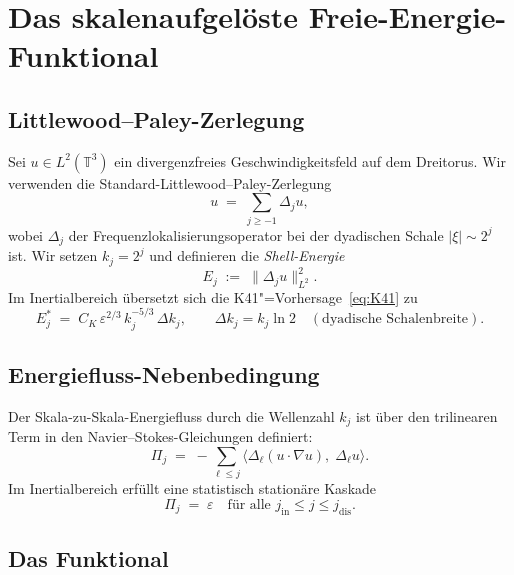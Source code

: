 \documentclass[12pt,a4paper]{article}
\theoremstyle{breakdef}
\theoremstyle{breakplain}
\theoremstyle{breakdef}
\begin{document}
\section{Das skalenaufgelöste Freie-Energie-Funktional}\label{sec:functional}

\subsection{Littlewood--Paley-Zerlegung}

Sei $u \in L^2(\mathbb{T}^3)$ ein divergenzfreies Geschwindigkeitsfeld auf
dem Dreitorus. Wir verwenden die Standard-Littlewood--Paley-Zerlegung
\begin{equation}\label{eq:LP}
  u \;=\; \sum_{j \ge -1} \Delta_j u,
\end{equation}
wobei $\Delta_j$ der Frequenzlokalisierungsoperator bei der dyadischen
Schale $|\xi| \sim 2^j$ ist. Wir setzen $k_j = 2^j$ und definieren die
\emph{Shell-Energie}
\begin{equation}\label{eq:Ej}
  E_j \;:=\; \|\Delta_j u\|_{L^2}^2.
\end{equation}
Im Inertialbereich übersetzt sich die K41"=Vorhersage~\eqref{eq:K41} zu
\begin{equation}\label{eq:Ej_star}
  E_j^* \;=\; C_K\, \varepsilon^{2/3}\, k_j^{-5/3} \,\Delta k_j,
  \qquad \Delta k_j = k_j \ln 2 \quad (\text{dyadische Schalenbreite}).
\end{equation}

\subsection{Energiefluss-Nebenbedingung}

Der Skala-zu-Skala-Energiefluss durch die Wellenzahl $k_j$ ist über den
trilinearen Term in den Navier--Stokes-Gleichungen definiert:
\begin{equation}\label{eq:flux}
  \Pi_j \;=\; -\sum_{\ell \le j}
    \langle \Delta_\ell(u \cdot \nabla u),\; \Delta_\ell u \rangle.
\end{equation}
Im Inertialbereich erfüllt eine statistisch stationäre Kaskade
\begin{equation}\label{eq:const_flux}
  \Pi_j \;=\; \varepsilon \quad \text{für alle } j_{\mathrm{in}} \le j \le j_{\mathrm{dis}}.
\end{equation}

\subsection{Das Funktional}
\end{document}
